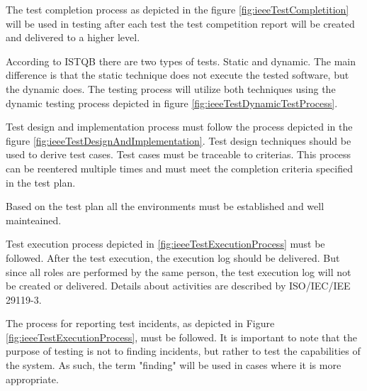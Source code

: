 The test completion process as depicted in the figure \ref{fig:ieeeTestCompletition} will be used in testing after each test the test competition report will be created and delivered to a higher level.


According to ISTQB \cite{FoundationOfSoftwareTesting} there are two types of tests. Static and dynamic. The main difference is that the static technique does not execute the tested software, but the dynamic does. The testing process will utilize both techniques using the dynamic testing process depicted in figure \ref{fig:ieeeTestDynamicTestProcess}.


Test design and implementation process must follow the process depicted in the figure \ref{fig:ieeeTestDesignAndImplementation}. Test design techniques should be used to derive test cases. Test cases must be traceable to criterias. This process can be reentered multiple times and must meet the completion criteria specified in the test plan.


Based on the test plan all the environments must be established and well mainteained.

Test execution process depicted in \ref{fig:ieeeTestExecutionProcess} must be followed. After the test execution, the execution log should be delivered. But since all roles are performed by the same person, the test execution log will not be created or delivered.
Details about activities are described by ISO/IEC/IEE 29119-3.


The process for reporting test incidents, as depicted in Figure \ref{fig:ieeeTestExecutionProcess}, must be followed. It is important to note that the purpose of testing is not to finding incidents, but rather to test the capabilities of the system. As such, the term "finding" will be used in cases where it is more appropriate.

